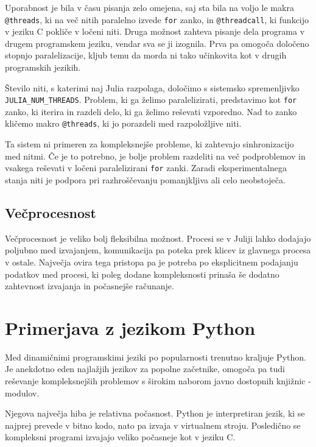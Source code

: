\documentclass[journal,a4paper,twoside]{sty/IEEEtran}
\begin{document}
Uporabnost je bila v času pisanja zelo omejena, saj sta bila na voljo le makra \texttt{@threads}, ki na več nitih paralelno izvede \texttt{for} zanko, in
	\texttt{@threadcall}, ki funkcijo v jeziku C pokliče v ločeni niti.\cite{julia-multithreading}
Druga možnost zahteva pisanje dela programa v drugem programskem jeziku, vendar sva se ji izognila.
Prva pa omogoča določeno stopnjo paralelizacije, kljub temu da morda ni tako učinkovita kot v drugih programskih jezikih.

Število niti, s katerimi naj Julia razpolaga, določimo s sistemsko spremenljivko \texttt{JULIA\_NUM\_THREADS}.
Problem, ki ga želimo paralelizirati, predstavimo kot \texttt{for} zanko, ki iterira in razdeli delo, ki ga želimo reševati vzporedno.
Nad to zanko kličemo makro \texttt{@threads}, ki jo porazdeli med razpoložljive niti.

Ta sistem ni primeren za kompleksnejše probleme, ki zahtevajo sinhronizacijo med nitmi.
Če je to potrebno, je bolje problem razdeliti na več podproblemov in vsakega reševati v ločeni paralelizirani \texttt{for} zanki.
Zaradi eksperimentalnega stanja niti je podpora pri razhroščevanju pomanjkljiva ali celo neobstoječa.\cite{julia-thread-problems}

\subsection{Večprocesnost}

Večprocesnost je veliko bolj fleksibilna možnost.
Procesi se v Juliji lahko dodajajo poljubno med izvajanjem, komunikacija pa poteka prek klicev iz glavnega procesa v ostale.
Največja ovira tega pristopa pa je potreba po eksplicitnem podajanju podatkov med procesi, ki poleg dodane kompleksnosti prinaša še dodatno zahtevnost
	izvajanja in počasnejše računanje.

\section{Primerjava z jezikom Python}

Med dinamičnimi programskimi jeziki po popularnosti trenutno kraljuje Python.\cite{python-tiobe}\cite{python-pypl}
Je anekdotno eden najlažjih jezikov za popolne začetnike, omogoča pa tudi reševanje kompleksnejših problemov s širokim naborom javno dostopnih knjižnic -
	modulov.\cite{python-pypi}

Njegova največja hiba je relativna počasnost.
Python je interpretiran jezik, ki se najprej prevede v bitno kodo, nato pa izvaja v virtualnem stroju.
Posledično se kompleksni programi izvajajo veliko počasneje kot v jeziku C.
\end{document}
